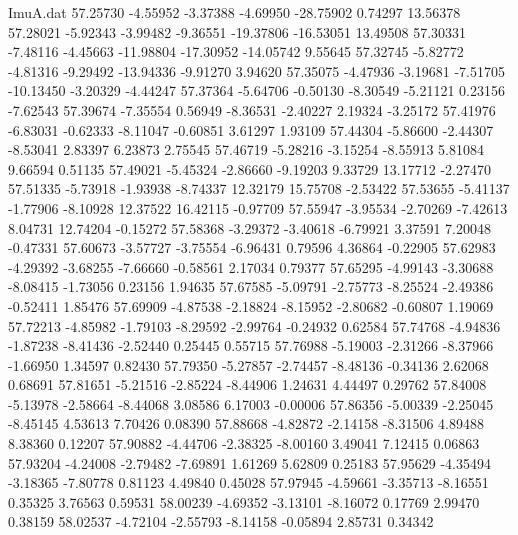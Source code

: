 \begin{filecontents}{ImuA.dat}
  57.25730   -4.55952   -3.37388   -4.69950  -28.75902    0.74297   13.56378
  57.28021   -5.92343   -3.99482   -9.36551  -19.37806  -16.53051   13.49508
  57.30331   -7.48116   -4.45663  -11.98804  -17.30952  -14.05742    9.55645
  57.32745   -5.82772   -4.81316   -9.29492  -13.94336   -9.91270    3.94620
  57.35075   -4.47936   -3.19681   -7.51705  -10.13450   -3.20329   -4.44247
  57.37364   -5.64706   -0.50130   -8.30549   -5.21121    0.23156   -7.62543
  57.39674   -7.35554    0.56949   -8.36531   -2.40227    2.19324   -3.25172
  57.41976   -6.83031   -0.62333   -8.11047   -0.60851    3.61297    1.93109
  57.44304   -5.86600   -2.44307   -8.53041    2.83397    6.23873    2.75545
  57.46719   -5.28216   -3.15254   -8.55913    5.81084    9.66594    0.51135
  57.49021   -5.45324   -2.86660   -9.19203    9.33729   13.17712   -2.27470
  57.51335   -5.73918   -1.93938   -8.74337   12.32179   15.75708   -2.53422
  57.53655   -5.41137   -1.77906   -8.10928   12.37522   16.42115   -0.97709
  57.55947   -3.95534   -2.70269   -7.42613    8.04731   12.74204   -0.15272
  57.58368   -3.29372   -3.40618   -6.79921    3.37591    7.20048   -0.47331
  57.60673   -3.57727   -3.75554   -6.96431    0.79596    4.36864   -0.22905
  57.62983   -4.29392   -3.68255   -7.66660   -0.58561    2.17034    0.79377
  57.65295   -4.99143   -3.30688   -8.08415   -1.73056    0.23156    1.94635
  57.67585   -5.09791   -2.75773   -8.25524   -2.49386   -0.52411    1.85476
  57.69909   -4.87538   -2.18824   -8.15952   -2.80682   -0.60807    1.19069
  57.72213   -4.85982   -1.79103   -8.29592   -2.99764   -0.24932    0.62584
  57.74768   -4.94836   -1.87238   -8.41436   -2.52440    0.25445    0.55715
  57.76988   -5.19003   -2.31266   -8.37966   -1.66950    1.34597    0.82430
  57.79350   -5.27857   -2.74457   -8.48136   -0.34136    2.62068    0.68691
  57.81651   -5.21516   -2.85224   -8.44906    1.24631    4.44497    0.29762
  57.84008   -5.13978   -2.58664   -8.44068    3.08586    6.17003   -0.00006
  57.86356   -5.00339   -2.25045   -8.45145    4.53613    7.70426    0.08390
  57.88668   -4.82872   -2.14158   -8.31506    4.89488    8.38360    0.12207
  57.90882   -4.44706   -2.38325   -8.00160    3.49041    7.12415    0.06863
  57.93204   -4.24008   -2.79482   -7.69891    1.61269    5.62809    0.25183
  57.95629   -4.35494   -3.18365   -7.80778    0.81123    4.49840    0.45028
  57.97945   -4.59661   -3.35713   -8.16551    0.35325    3.76563    0.59531
  58.00239   -4.69352   -3.13101   -8.16072    0.17769    2.99470    0.38159
  58.02537   -4.72104   -2.55793   -8.14158   -0.05894    2.85731    0.34342

\end{filecontents}
